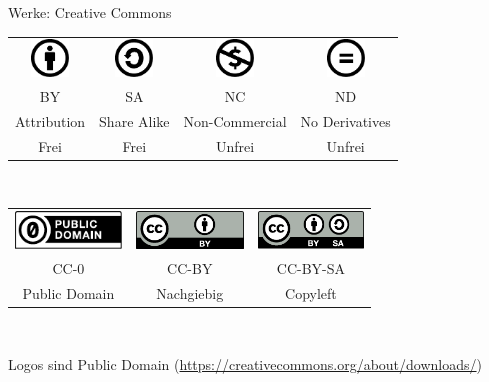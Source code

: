 {\begin{frame}{Werke: Creative Commons}
	\begin{center}
	\begin{tabular}{cccc}
		\includegraphics[height=1cm]{res/by.pdf}
		&
		\includegraphics[height=1cm]{res/sa.pdf}
		&
		\includegraphics[height=1cm]{res/nc.pdf}
		&
		\includegraphics[height=1cm]{res/nd.pdf}
	\\
		BY
		&
		SA
		&
		NC
		&
		ND
	\\
		Attribution
		&
		Share Alike
		&
		Non-Commercial
		&
		No Derivatives
	\\
		Frei
		&
		Frei
		&
		Unfrei
		&
		Unfrei
	\end{tabular} 
	\\
	\vspace{1cm}
	\begin{tabular}{ccc}
		\includegraphics[height=1cm]{res/cc-zero.pdf}
		&
		\includegraphics[height=1cm]{res/cc-by.pdf}
		&
		\includegraphics[height=1cm]{res/cc-by-sa.pdf}
	\\
		CC-0
		&
		CC-BY
		&
		CC-BY-SA
	\\
		Public Domain
		&
		Nachgiebig
		&
		Copyleft
	\end{tabular} 
	\\
	\vspace{1cm}
	\end{center}
\end{frame}
\note
{
	Logos sind Public Domain (\url{https://creativecommons.org/about/downloads/})
}


}
